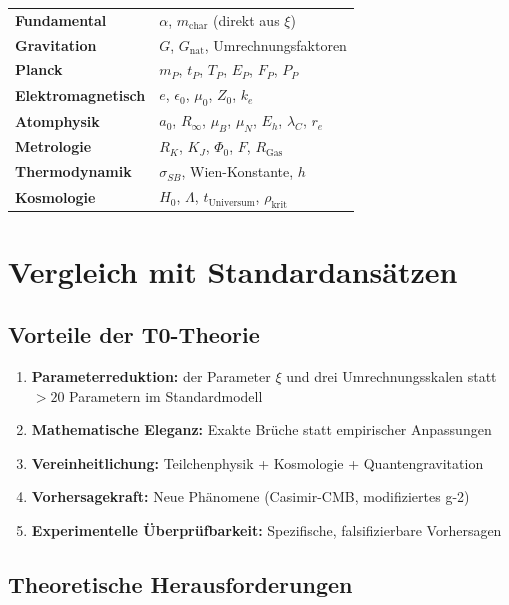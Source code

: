 	\begin{center}
		\begin{tabular}{ll}
			\textbf{Fundamental} & $\alpha$, $m_{\text{char}}$ (direkt aus $\xi$) \\
			\textbf{Gravitation} & $G$, $G_{\text{nat}}$, Umrechnungsfaktoren \\
			\textbf{Planck} & $m_P$, $t_P$, $T_P$, $E_P$, $F_P$, $P_P$ \\
			\textbf{Elektromagnetisch} & $e$, $\epsilon_0$, $\mu_0$, $Z_0$, $k_e$ \\
			\textbf{Atomphysik} & $a_0$, $R_\infty$, $\mu_B$, $\mu_N$, $E_h$, $\lambda_C$, $r_e$ \\
			\textbf{Metrologie} & $R_K$, $K_J$, $\Phi_0$, $F$, $R_{\text{Gas}}$ \\
			\textbf{Thermodynamik} & $\sigma_{SB}$, Wien-Konstante, $h$ \\
			\textbf{Kosmologie} & $H_0$, $\Lambda$, $t_{\text{Universum}}$, $\rho_{\text{krit}}$ \\
		\end{tabular}
	\end{center}
	
	\section{Vergleich mit Standardansätzen}
	
	\subsection{Vorteile der T0-Theorie}
	
	\begin{enumerate}
		\item \textbf{Parameterreduktion:} der Parameter $\xi$ und drei Umrechnungsskalen statt $>20$ Parametern im Standardmodell
		\item \textbf{Mathematische Eleganz:} Exakte Brüche statt empirischer Anpassungen
		\item \textbf{Vereinheitlichung:} Teilchenphysik + Kosmologie + Quantengravitation
		\item \textbf{Vorhersagekraft:} Neue Phänomene (Casimir-CMB, modifiziertes g-2)
		\item \textbf{Experimentelle Überprüfbarkeit:} Spezifische, falsifizierbare Vorhersagen
	\end{enumerate}
	
	\subsection{Theoretische Herausforderungen}
	
